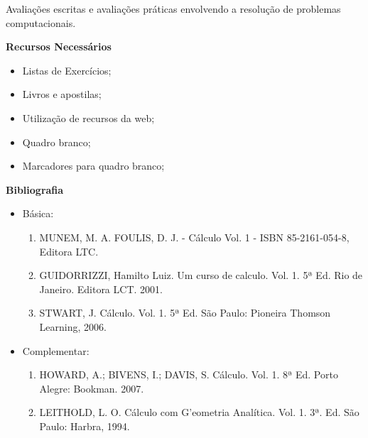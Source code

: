 \noindent
   Avaliações escritas e avaliações práticas envolvendo a resolução de problemas computacionais.
   
\begin{snugshade}\begin{center}\textbf{
    Recursos Necessários
    \vphantom{q} %
}\end{center}\end{snugshade}

\begin{itemize} 
  \item Listas de Exercícios;
  \item Livros e apostilas;
  \item Utilização de recursos da web;
  \item Quadro branco;
  \item Marcadores para quadro branco;
\end{itemize}


\begin{snugshade}\begin{center}\textbf{
    Bibliografia
}\end{center}\end{snugshade}

\begin{itemize} 
  \item Básica:
	\begin{enumerate}
	\item MUNEM, M. A. FOULIS, D. J. - Cálculo Vol. 1 - ISBN  85-2161-054-8, Editora LTC.
	\item GUIDORRIZZI, Hamilto Luiz. Um curso de calculo. Vol. 1. 5ª Ed. Rio de Janeiro. Editora LCT. 2001.
	\item STWART, J. Cálculo. Vol. 1. 5ª Ed. São Paulo: Pioneira Thomson Learning, 2006.
	\end{enumerate}
  \item Complementar:
	\begin{enumerate} 
	\item  HOWARD, A.; BIVENS, I.; DAVIS, S. Cálculo. Vol. 1. 8ª Ed. Porto Alegre: Bookman.  2007.
	\item  LEITHOLD, L. O. Cálculo com G'eometria Analítica. Vol. 1. 3ª. Ed. São Paulo: Harbra, 1994.
	\end{enumerate}
\end{itemize}

